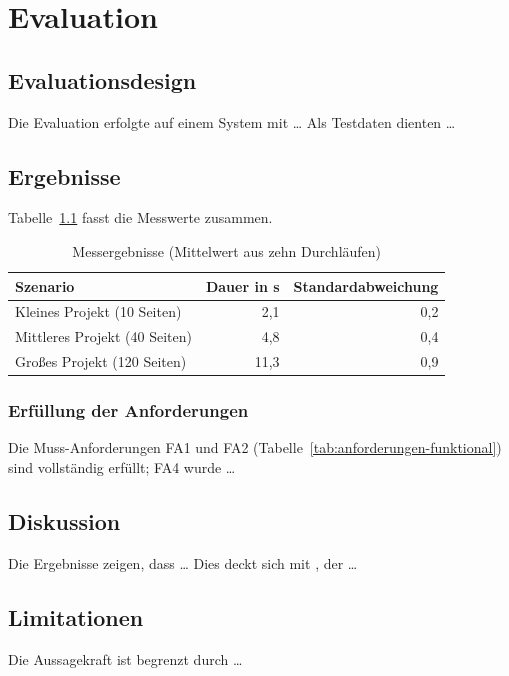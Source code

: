 \chapter{Evaluation}
\label{cha:evaluation}


\section{Evaluationsdesign}
\label{sec:eval-design}

Die Evaluation erfolgte auf einem System mit \ldots{} Als Testdaten dienten \ldots

\section{Ergebnisse}
\label{sec:ergebnisse}

Tabelle~\ref{tab:ergebnisse} fasst die Messwerte zusammen.

\begin{table}[htbp]
  \centering
  \caption{Messergebnisse (Mittelwert aus zehn Durchläufen)}
  \label{tab:ergebnisse}
  \begin{tabular}{lrr}
    \toprule
    Szenario & Dauer in s & Standardabweichung \\
    \midrule
    Kleines Projekt (10 Seiten) & 2{,}1 & 0{,}2 \\
    Mittleres Projekt (40 Seiten) & 4{,}8 & 0{,}4 \\
    Großes Projekt (120 Seiten) & 11{,}3 & 0{,}9 \\
    \bottomrule
  \end{tabular}
\end{table}

\subsection{Erfüllung der Anforderungen}
Die Muss-Anforderungen FA1 und FA2 (Tabelle~\ref{tab:anforderungen-funktional})
sind vollständig erfüllt; FA4 wurde \ldots

\section{Diskussion}
\label{sec:diskussion}

Die Ergebnisse zeigen, dass \ldots{} Dies deckt sich mit \textcite{knuth1984literate},
der \ldots

\section{Limitationen}
\label{sec:limitationen}

Die Aussagekraft ist begrenzt durch \ldots
